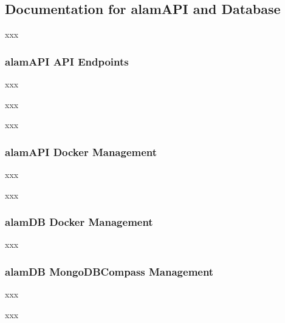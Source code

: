 \subsection{Documentation for alamAPI and Database}
\label{subsubsec:doc_API_DB}
xxx

\subsubsection{alamAPI API Endpoints}
\label{subsubsec:alamAPI_API_endpoints}
xxx

xxx

xxx

\subsubsection{alamAPI Docker Management}
\label{subsubsec:alamAPI_docker_management}
xxx

xxx


\subsubsection{alamDB Docker Management}
\label{subsubsec:alamDB_docker_management}
xxx


\subsubsection{alamDB MongoDBCompass Management}
\label{subsubsec:alamBB_docker_management}
xxx

xxx